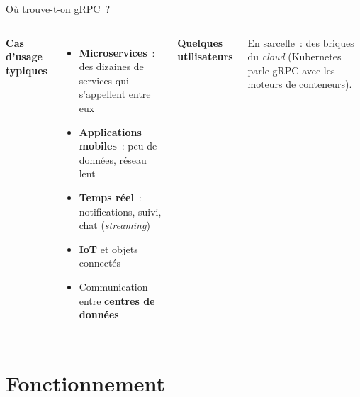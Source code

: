 \documentclass[aspectratio=169,11pt]{beamer}
\begin{document}
\begin{frame}{Où trouve-t-on gRPC~?}
  \begin{columns}[T,onlytextwidth]
    \textbf{Cas d'usage typiques}
    \begin{itemize}\small
      \item \textbf{Microservices}~: des dizaines de services qui s'appellent entre eux
      \item \textbf{Applications mobiles}~: peu de données, réseau lent
      \item \textbf{Temps réel}~: notifications, suivi, chat (\emph{streaming})
      \item \textbf{IoT} et objets connectés
      \item Communication entre \textbf{centres de données}
    \end{itemize}
    \textbf{Quelques utilisateurs}
    \vspace{0.15cm}


    \vspace{0.1cm}
    {\scriptsize\color{Muted}En sarcelle~: des briques du \emph{cloud} (Kubernetes parle gRPC avec les moteurs de conteneurs).}
  \end{columns}
\end{frame}

\section{Fonctionnement}
\end{document}
